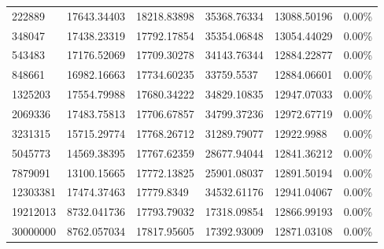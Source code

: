 \documentclass[12pt]{article} %
\begin{document}
\begin{table}[]
{\begin{tabular}{@{}llllll@{}}
222889 & 17643.34403 & 18218.83898 & 35368.76334 & 13088.50196 & 0.00\% \\
348047 & 17438.23319 & 17792.17854 & 35354.06848 & 13054.44029 & 0.00\% \\
543483 & 17176.52069 & 17709.30278 & 34143.76344 & 12884.22877 & 0.00\% \\
848661 & 16982.16663 & 17734.60235 & 33759.5537 & 12884.06601 & 0.00\% \\
1325203 & 17554.79988 & 17680.34222 & 34829.10835 & 12947.07033 & 0.00\% \\
2069336 & 17483.75813 & 17706.67857 & 34799.37236 & 12972.67719 & 0.00\% \\
3231315 & 15715.29774 & 17768.26712 & 31289.79077 & 12922.9988 & 0.00\% \\
5045773 & 14569.38395 & 17767.62359 & 28677.94044 & 12841.36212 & 0.00\% \\
7879091 & 13100.15665 & 17772.13825 & 25901.08037 & 12891.50194 & 0.00\% \\
12303381 & 17474.37463 & 17779.8349 & 34532.61176 & 12941.04067 & 0.00\% \\
19212013 & 8732.041736 & 17793.79032 & 17318.09854 & 12866.99193 & 0.00\% \\
30000000 & 8762.057034 & 17817.95605 & 17392.93009 & 12871.03108 & 0.00\% \\ \bottomrule
\end{tabular}%
}
\end{table}

\end{document}

